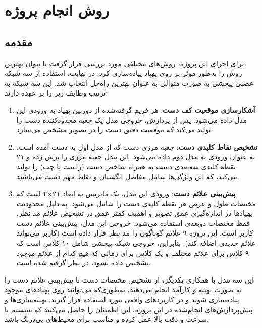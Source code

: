 \chapter{روش انجام پروژه}
\section{مقدمه}
برای اجرای این پروژه، روش‌های مختلفی مورد بررسی قرار گرفت تا بتوان بهترین روش را به‌طور موثر  بر روی پهپاد پیاده‌سازی کرد. در نهایت، استفاده از سه شبکه عصبی پیچشی به صورت متوالی به عنوان بهترین راه‌حل انتخاب شد. این سه شبکه به ترتیب وظایف زیر را بر عهده دارند:

\begin{enumerate}
    \item \textbf{آشکارسازی موقعیت کف دست}: هر فریم گرفته‌شده از دوربین پهپاد به ورودی این مدل داده می‌شود. پس از پردازش، خروجی مدل یک جعبه محدودکننده  دست را تولید می‌کند که موقعیت دقیق دست را در تصویر مشخص می‌سازد.
    
    \item \textbf{تشخیص نقاط کلیدی دست}: جعبه مرزی دست که از مدل اول به دست آمده است، به عنوان ورودی به مدل دوم داده می‌شود. این مدل جعبه مرزی را برش زده و ۲۱ نقطه کلیدی سه‌بعدی دست به همراه شاخص دست (راست یا چپ) را تولید می‌کند، که این ویژگی‌ها شامل مفاصل انگشتان و نقاط مهم دست می‌باشند.
    
    \item \textbf{پیش‌بینی علائم دست}: ورودی این مدل، یک ماتریس به ابعاد ۲۱×۲ است که مختصات طول و عرض هر نقطه کلیدی دست را شامل می‌شود. به دلیل محدودیت پهپادها در اندازه‌گیری عمق تصویر و اهمیت کمتر عمق در تشخیص علائم مد نظر، فقط مختصات دوبعدی استفاده می‌شود. خروجی این مدل، پیش‌بینی علائم دست کاربر است. این پروژه ۹ علائم گوناگون را مد نظر قرار داده است (کاربر می‌تواند علائم‌ جدیدی اضافه کند). بنابراین، خروجی شبکه پیچشی شامل ۱۰ کلاس است که ۹ کلاس برای علائم مختلف و یک کلاس برای زمانی که هیچ کدام از علائم موجود تشخیص داده نشود، در نظر گرفته شده است.
\end{enumerate}

این سه مدل با همکاری یکدیگر، از تشخیص  مختصات دست تا پیش‌بینی علائم دست را به صورت بهینه و کارآمد انجام می‌دهند، به‌طوری‌که می‌توانند روی پهپادهای موجود پیاده‌سازی شوند و در کاربردهای واقعی مورد استفاده قرار گیرند. بهینه‌سازی‌ها و پیش‌پردازش‌های انجام‌شده در این پروژه،  این اطمینان را حاصل می‌کنند که سیستم با سرعت و دقت بالا عمل کرده و مناسب برای محیط‌های بی‌درنگ باشد.


